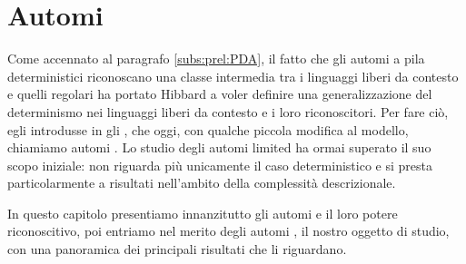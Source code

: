 \chapter{Automi }
Come accennato al paragrafo \ref{subs:prel:PDA}, il fatto che gli automi a pila deterministici riconoscano una classe intermedia tra i linguaggi liberi da contesto e quelli regolari ha portato Hibbard a voler definire una generalizzazione del determinismo nei linguaggi liberi da contesto e i loro riconoscitori. Per fare ciò, egli introdusse in \cite{Hibbard:67:CFdet} gli , che oggi, con qualche piccola modifica al modello, chiamiamo automi . Lo studio degli automi limited ha ormai superato il suo scopo iniziale: non riguarda più unicamente il caso deterministico e si presta particolarmente a risultati nell'ambito della complessità descrizionale.

In questo capitolo presentiamo innanzitutto gli automi  e il loro potere riconoscitivo, poi entriamo nel merito degli automi , il nostro oggetto di studio, con una panoramica dei principali risultati che li riguardano.



